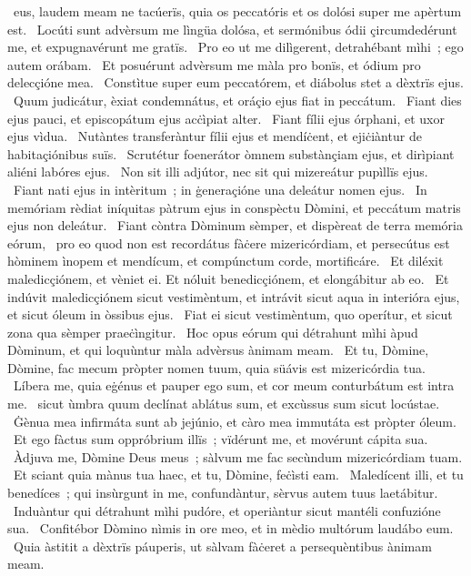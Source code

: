 { }
{%
~eus, laudem meam ne tacúerïs, quia os peccatóris et os dolósi super me apèrtum est. 
~Locúti sunt advèrsum me lìngüa dolósa, et sermónibus ódii çircumdedérunt me, et expugnavérunt me gratïs. 
~Pro eo ut me dilìgerent, detrahébant mìhi~; ego autem orábam. 
~Et posuérunt advèrsum me màla pro bonïs, et ódium pro delecçióne mea. 
~Constìtue super eum peccatórem, et diábolus stet a dèxtrïs ejus. 
~Quum judicátur, èxiat condemnátus, et oráçio ejus fiat in peccátum. 
~Fiant dies ejus pauci, et episcopátum ejus acċìpiat alter. 
~Fiant fílii ejus órphani, et uxor ejus vìdua. 
~Nutàntes transferàntur fílii ejus et mendíċent, et ejiċiàntur de habitaçiónibus suïs. 
~Scrutétur foenerátor òmnem substànçiam ejus, et dirìpiant aliéni labóres ejus. 
~Non sit illi adjútor, nec sit qui mizereátur pupìllïs ejus. 
~Fiant nati ejus in intèritum~; in ġeneraçióne una deleátur nomen ejus. 
~In memóriam rèdiat iníquitas pàtrum ejus in conspèctu Dòmini, et peccátum matris ejus non deleátur. 
~Fiant còntra Dòminum sèmper, et dispèreat de terra memória eórum, 
~pro eo quod non est recordátus fàċere mizericórdiam, et persecútus est hòminem ìnopem et mendícum, et compúnctum corde, mortificáre. 
~Et diléxit maledicçiónem, et vèniet ei. Et nóluit benedicçiónem, et elongábitur ab eo. 
~Et indúvit maledicçiónem sicut vestimèntum, et intrávit sicut aqua in interióra ejus, et sicut óleum in òssibus ejus. 
~Fiat ei sicut vestimèntum, quo operítur, et sicut zona qua sèmper praeċìngitur. 
~Hoc opus eórum qui détrahunt mìhi àpud Dòminum, et qui loquùntur màla advèrsus ànimam meam. 
~Et tu, Dòmine, Dòmine, fac mecum pròpter nomen tuum, quia süávis est mizericórdia tua. 
~Líbera me, quia eġénus et pauper ego sum, et cor meum conturbátum est intra me. 
~sicut ùmbra quum declínat ablátus sum, et excùssus sum sicut locústae. 
~Ġènua mea infirmáta sunt ab jejúnio, et càro mea immutáta est pròpter óleum. 
~Et ego fàctus sum oppróbrium illïs~; vïdérunt me, et movérunt cápita sua. 
~Àdjuva me, Dòmine Deus meus~; sàlvum me fac secùndum mizericórdiam tuam. 
~Et sciant quia mànus tua haec, et tu, Dòmine, feċìsti eam. 
~Maledícent illi, et tu benedíces~; qui insùrgunt in me, confundàntur, sèrvus autem tuus laetábitur. 
~Induàntur qui détrahunt mìhi pudóre, et operiàntur sicut mantéli confuzióne sua. 
~Confitébor Dòmino nìmis in ore meo, et in mèdio multórum laudábo eum. 
~Quia àstitit a dèxtrïs páuperis, ut sàlvam fàċeret a persequèntibus ànimam meam. 
}
